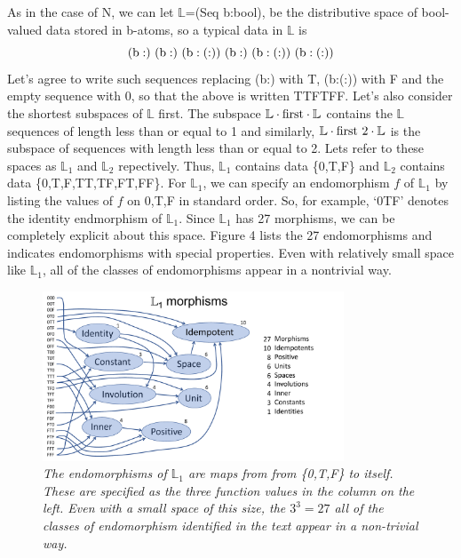 \documentclass[11pt]{article}
\begin{document}
As in the case of N, we can let $\mathbb L$=(Seq b:bool), be the distributive space of bool-valued data stored in b-atoms, so a typical data in $\mathbb L$ is 
\begin{equation}
{\rm (b:)\ (b:)\ (b:(:))\ (b:)\ (b:(:))\ (b:(:))}
\end{equation}
Let's agree to write such sequences replacing (b:) with T, (b:(:)) with F and the empty sequence with 0, so that the above is written TTFTFF.   
Let's also consider the shortest subspaces of $\mathbb L$ first.  
The subspace ${\mathbb L}\cdot {\rm first}\cdot{\mathbb L}$ contains the $\mathbb L$ sequences of length less than or equal to 1 and similarly,  
${\mathbb L}\cdot {\rm first\ 2}\cdot{\mathbb L}$ is the subspace of sequences with length less than or equal to 2.  Lets refer to these spaces as 
${\mathbb L}_1$ and ${\mathbb L}_2$ repectively.  
Thus, ${\mathbb L}_1$ contains data \{0,T,F\} and ${\mathbb L}_2$ contains data \{0,T,F,TT,TF,FT,FF\}. 
For ${\mathbb L}_1$, we can specify an endomorphism $f$ of ${\mathbb L}_1$ by listing the values of $f$ on 0,T,F in standard order.  So, for example, 
`0TF' denotes the identity endmorphism of ${\mathbb L}_1$.  
Since ${\mathbb L}_1$ has 27 morphisms, we can be completely explicit about this space.  
Figure 4 lists the 27 endomorphisms and indicates endomorphisms with special properties.  Even with relatively small space like ${\mathbb L}_1$, all of 
the classes of endomorphisms appear in a nontrivial way.

\begin{figure}[h]
\centering
\includegraphics[width=0.8\textwidth]{L1.pdf}
\caption{{\it The endomorphisms of ${\mathbb L}_1$ are maps from from \{0,T,F\} to itself. These are specified as the three function 
values in the column on the left.  Even with a small space of this size, the $3^3=27$ all of the classes of endomorphism identified in the text 
appear in a non-trivial way.}}
\end{figure}
\end{document}
